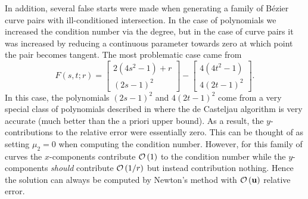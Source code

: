 In addition, several false starts were made when generating a family of
B\'{e}zier curve pairs with ill-conditioned intersection. In the
case of polynomials we increased the condition number via the degree,
but in the case of curve pairs it was increased by reducing a continuous
parameter towards zero at which point the pair becomes tangent. The
most problematic case came from
\begin{equation}
F(s, t; r) = \left[ \begin{array}{c} 2(4s^2 - 1) + r \\ (2s - 1)^2
\end{array}\right] - \left[ \begin{array}{c} 4(4t^2 - 1) \\ 4(2t - 1)^2
\end{array}\right].
\end{equation}
In this case, the polynomials \((2s - 1)^2\) and \(4(2t - 1)^2\) come
from a very special class of polynomials described in \cite{Hermes2018}
where the de Casteljau algorithm is very accurate (much better than
the a priori upper bound). As a result, the \(y\)-contributions to the
relative error were essentially zero. This can be thought of as setting
\(\mu_2 = 0\) when computing the condition number. However, for this family
of curves the \(x\)-components contribute \(\mathcal{O}\left(1\right)\) to the condition
number while the \(y\)-components \textit{should} contribute \(\mathcal{O}\left(1/r\right)\)
but instead contribution nothing. Hence the solution can always be computed
by Newton's method with \(\mathcal{O}\left(\mathbf{u}\right)\) relative error.
